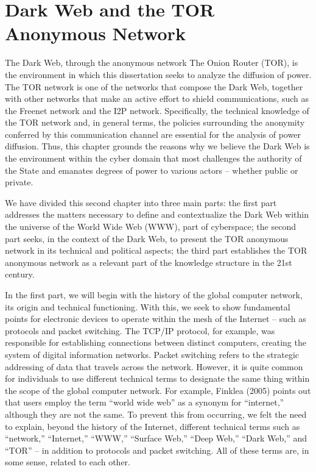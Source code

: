 \chapter{Dark Web and the TOR Anonymous Network}

\setcounter{footnote}{73} %

The Dark Web, through the anonymous network The Onion Router (TOR), is the environment in which this dissertation seeks to analyze the diffusion of power. The TOR network is one of the networks that compose the Dark Web, together with other networks that make an active effort to shield communications, such as the Freenet network and the I2P network. Specifically, the technical knowledge of the TOR network and, in general terms, the policies surrounding the anonymity conferred by this communication channel are essential for the analysis of power diffusion. Thus, this chapter grounds the reasons why we believe the Dark Web is the environment within the cyber domain that most challenges the authority of the State and emanates degrees of power to various actors -- whether public or private.

We have divided this second chapter into three main parts: the first part addresses the matters necessary to define and contextualize the Dark Web within the universe of the World Wide Web (WWW), part of cyberspace; the second part seeks, in the context of the Dark Web, to present the TOR anonymous network in its technical and political aspects; the third part establishes the TOR anonymous network as a relevant part of the knowledge structure in the 21st century.

In the first part, we will begin with the history of the global computer network, its origin and technical functioning. With this, we seek to show fundamental points for electronic devices to operate within the mesh of the Internet -- such as protocols and packet switching. The TCP/IP protocol, for example, was responsible for establishing connections between distinct computers, creating the system of digital information networks. Packet switching refers to the strategic addressing of data that travels across the network. However, it is quite common for individuals to use different technical terms to designate the same thing within the scope of the global computer network. For example, Finklea (2005) points out that users employ the term ``world wide web'' as a synonym for ``internet,'' although they are not the same. To prevent this from occurring, we felt the need to explain, beyond the history of the Internet, different technical terms such as ``network,'' ``Internet,'' ``WWW,'' ``Surface Web,'' ``Deep Web,'' ``Dark Web,'' and ``TOR'' -- in addition to protocols and packet switching. All of these terms are, in some sense, related to each other.

